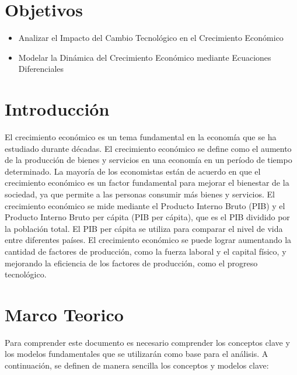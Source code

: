 \documentclass[letterpaper, 10pt]{article}
\begin{document}
\section*{Objetivos}

\begin{itemize}
  \item Analizar el Impacto del Cambio Tecnológico en el Crecimiento Económico

  \item Modelar la Dinámica del Crecimiento Económico mediante Ecuaciones Diferenciales
\end{itemize}

\section{Introducción}

El crecimiento económico es un tema fundamental en la economía que se ha estudiado durante décadas. El crecimiento económico se define como el aumento de la producción de bienes y servicios en una economía en un período de tiempo determinado. La mayoría de los economistas están de acuerdo en que el crecimiento económico es un factor fundamental para mejorar el bienestar de la sociedad, ya que permite a las personas consumir más bienes y servicios. \cite{Moret09} El crecimiento económico se mide mediante el Producto Interno Bruto (PIB) y el Producto Interno Bruto per cápita (PIB per cápita), que es el PIB dividido por la población total. El PIB per cápita se utiliza para comparar el nivel de vida entre diferentes países. El crecimiento económico se puede lograr aumentando la cantidad de factores de producción, como la fuerza laboral y el capital físico, y mejorando la eficiencia de los factores de producción, como el progreso tecnológico. \cite{Moret09}



\section{Marco Teorico}
  Para comprender este documento es necesario comprender los conceptos clave y los modelos fundamentales que se utilizarán como base para el análisis. A continuación, se definen de manera sencilla los conceptos y modelos clave:
\end{document}
